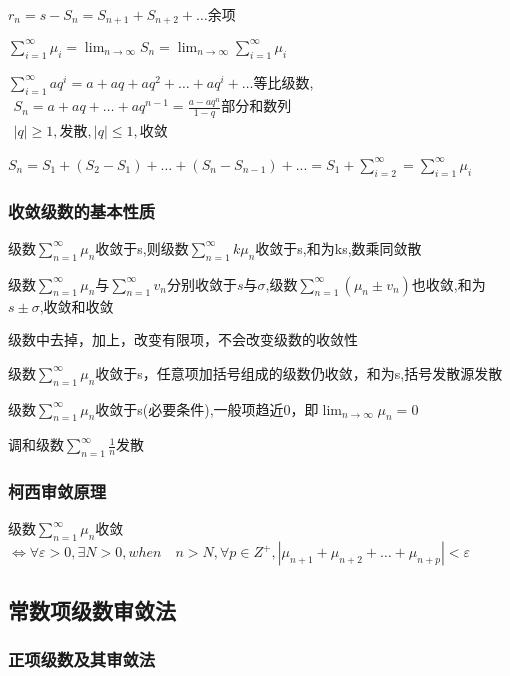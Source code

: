 \documentclass[UTF8]{ctexart}
\newcommand{\mt}[1]{\text{#1}}
\newcommand{\md}[1]{\displaystyle{#1}}
\newcommand{\mda}[1]{$\displaystyle{ #1 }$}
\newcommand{\mf}[1]{\left( #1\right)}
\newcommand{\mfa}[1]{\left| #1\right|}
\newcommand{\q}{\quad}
\newcommand{\ma}[1]{\begin{array}{llll} #1 \end{array}}
\begin{document}
    
$r_n=s-S_n=S_{n+1}+S_{n+2}+\dots$余项

$\md{\sum_{i=1}^\infty \mu_i=\lim_{n \rightarrow \infty}S_n=\lim_{n \rightarrow \infty}\sum_{i=1}^\infty \mu_i}$

\mda{\sum_{i=1}^\infty aq^i=a+aq+aq^2+\dots+aq^i+\dots}等比级数,\mda{\ma{S_n=a+aq+\dots+aq^{n-1}=\frac{a-aq^n}{1-q}\mt{部分和数列}\\
\mfa{q}\geqslant 1,\mt{发散},\mfa{q}\leqslant 1,\mt{收敛}
}}

\mda{S_n=S_1+\mf{S_2-S_1}+\dots+\mf{S_n-S_{n-1}}+...=S_1+\sum_{i=2}^\infty=\sum_{i=1}^\infty \mu_i }

\subsubsection{收敛级数的基本性质}

级数\mda{\sum_{n=1}^\infty\mu_n}收敛于s,则级数\mda{\sum_{n=1}^\infty k\mu_n}收敛于s,和为ks,数乘同敛散

级数\mda{\sum_{n=1}^\infty\mu_n}与\mda{\sum_{n=1}^\infty v_n}分别收敛于$s$与$\sigma$,级数\mda{\sum_{n=1}^\infty \mf{\mu_n \pm v_n}}也收敛,和为$s\pm \sigma$,收敛和收敛

级数中去掉，加上，改变有限项，不会改变级数的收敛性

级数\mda{\sum_{n=1}^\infty\mu_n}收敛于s，任意项加括号组成的级数仍收敛，和为s,括号发散源发散

级数\mda{\sum_{n=1}^\infty\mu_n}收敛于s(必要条件),一般项趋近0，即\mda{\lim_{n \rightarrow \infty}\mu_n=0}

调和级数\mda{\sum_{n=1}^\infty \frac{1}{n}}发散

\subsubsection{柯西审敛原理}

级数\mda{\sum_{n=1}^\infty\mu_n}收敛 $\Leftrightarrow \forall \varepsilon>0,\exists N>0,when \q n>N,\forall p \in Z^+ ,\mfa{\mu_{n+1} +\mu_{n+2}+\dots+\mu_{n+p}}<\varepsilon$

\subsection{常数项级数审敛法}

\subsubsection{正项级数及其审敛法}
\end{document}
